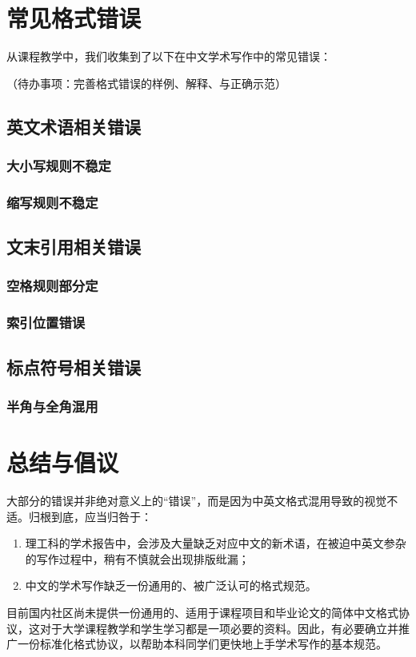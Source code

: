 \documentclass[a4paper,11pt,AutoFakeBold]{ctexart}
\begin{document}
\section{常见格式错误}

从课程教学中，我们收集到了以下在中文学术写作中的常见错误：

（待办事项：完善格式错误的样例、解释、与正确示范）

\subsection{英文术语相关错误}

\subsubsection{大小写规则不稳定}

\subsubsection{缩写规则不稳定}

\subsection{文末引用相关错误}

\subsubsection{空格规则部分定}

\subsubsection{索引位置错误}

\subsection{标点符号相关错误}

\subsubsection{半角与全角混用}

\section{总结与倡议}

大部分的错误并非绝对意义上的“错误”，而是因为中英文格式混用导致的视觉不适。归根到底，应当归咎于：

\begin{enumerate}
    \item 理工科的学术报告中，会涉及大量缺乏对应中文的新术语，在被迫中英文参杂的写作过程中，稍有不慎就会出现排版纰漏；
    \item 中文的学术写作缺乏一份通用的、被广泛认可的格式规范。
\end{enumerate}

目前国内社区尚未提供一份通用的、适用于课程项目和毕业论文的简体中文格式协议，这对于大学课程教学和学生学习都是一项必要的资料。因此，有必要确立并推广一份标准化格式协议，以帮助本科同学们更快地上手学术写作的基本规范。

\printbibliography[heading=bibliography,title=参考文献]
\end{document}

